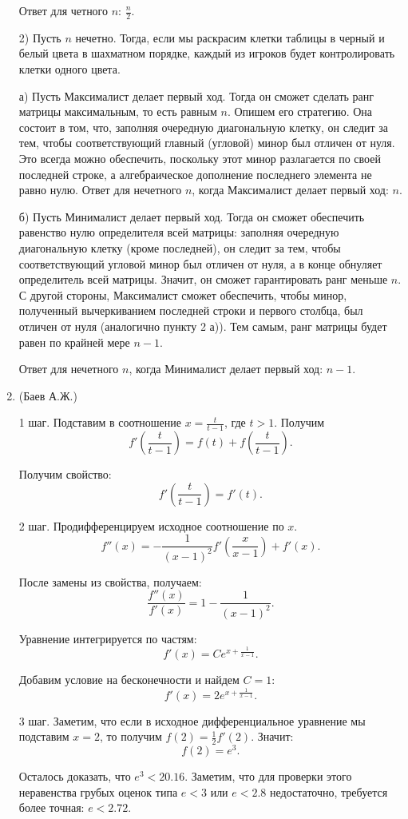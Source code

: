 \documentclass[12pt, a4paper]{article}
\begin{document}
\begin{enumerate}
Ответ для четного $n$: $\frac{n}{2}$.

2) Пусть $n$ нечетно. Тогда, если мы раскрасим клетки таблицы в черный и белый цвета в шахматном порядке, каждый из игроков будет контролировать клетки одного цвета. 

а) Пусть Максималист делает первый ход. Тогда он сможет сделать ранг матрицы максимальным, то есть равным $n$. Опишем его стратегию. Она состоит в том, что, заполняя очередную диагональную клетку, он следит за тем, чтобы соответствующий главный (угловой) минор был отличен от нуля. Это всегда можно обеспечить, поскольку этот минор разлагается по своей последней строке, а алгебраическое дополнение последнего элемента не равно нулю. 
Ответ для нечетного $n$, когда Максималист делает первый ход: $n$. 

б) Пусть Минималист делает первый ход. Тогда он сможет обеспечить равенство нулю определителя всей матрицы: заполняя очередную диагональную клетку (кроме последней), он следит за тем, чтобы соответствующий угловой минор был отличен от нуля, а в конце обнуляет определитель всей матрицы. Значит, он сможет гарантировать ранг меньше $n$. С другой стороны, Максималист сможет обеспечить, чтобы минор, полученный вычеркиванием последней строки и первого столбца, был отличен от нуля (аналогично пункту 2 а)). Тем самым, ранг матрицы будет равен по крайней мере $n-1$. 

Ответ для нечетного $n$, когда Минималист делает первый ход: $n-1$. 
 
\item (Баев А.Ж.)

1 шаг. Подставим в соотношение $x = \frac{t}{t-1}$, где $t > 1$. Получим
$$f'\left(\frac{t}{t-1}\right) = f(t) + f\left( \frac{t}{t-1} \right) .$$

Получим свойство:
$$f' \left(\frac{t}{t-1} \right) = f'(t).$$

2 шаг. Продифференцируем исходное соотношение по $x$.
$$ f''(x) = - \frac{1}{(x-1)^2} f' \left( \frac{x}{x-1} \right) + f'(x) .$$

После замены из свойства, получаем:
$$ \frac{f''(x)}{f'(x)} = 1 - \frac{1}{(x-1)^2} .$$

Уравнение интегрируется по частям:
$$ f'(x) = C e^{x + \frac{1}{x-1}}.$$

Добавим условие на бесконечности и найдем $C = 1$:
$$ f'(x) = 2 e^{x + \frac{1}{x-1}}.$$

3 шаг. Заметим, что если в исходное дифференциальное уравнение мы подставим $x = 2$, то получим $f(2) = \frac{1}{2} f'(2)$. Значит:
$$ f(2) = e^3.$$

Осталось доказать, что $e^3 < 20.16$. Заметим, что для проверки этого неравенства грубых оценок типа $e<3$ или $e<2.8$ недостаточно, требуется более точная: $e<2.72$.

\end{enumerate}
\end{document}
